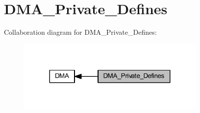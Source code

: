 \hypertarget{group___d_m_a___private___defines}{}\section{D\+M\+A\+\_\+\+Private\+\_\+\+Defines}
\label{group___d_m_a___private___defines}
Collaboration diagram for D\+M\+A\+\_\+\+Private\+\_\+\+Defines\+:
\nopagebreak
\begin{figure}[H]
\begin{center}
\leavevmode
\includegraphics[width=264pt]{group___d_m_a___private___defines}
\end{center}
\end{figure}
